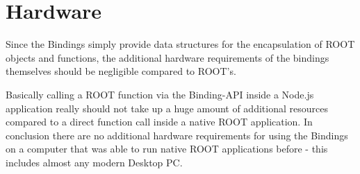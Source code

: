 \section{Hardware}

Since the Bindings simply provide data structures for the encapsulation of ROOT objects and functions, the additional hardware requirements of the bindings themselves 
should be negligible compared to ROOT's.\par
Basically calling a ROOT function via the Binding-API inside a Node.js application really should not take up a huge amount of additional resources compared to a direct function call inside a native ROOT application.
In conclusion there are no additional hardware requirements for using the Bindings on a computer that was able to run native ROOT applications before - this includes almost any modern Desktop PC.
